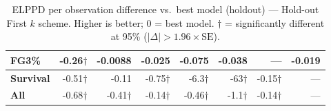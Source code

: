 \begin{table}[H]
{\begin{tabular}{lrrrrrrr}
FG3\% & -0.26$\dagger$ & -0.0088 & -0.025 & -0.075 & -0.038 & --- & -0.019 \\[2pt]
\midrule
\textbf{Survival} & -0.51$\dagger$ & -0.11 & -0.75$\dagger$ & -6.3$\dagger$ & -63$\dagger$ & -0.15$\dagger$ & --- \\
\midrule
\textbf{All} & -0.68$\dagger$ & -0.41$\dagger$ & -0.14$\dagger$ & -0.46$\dagger$ & -1.1$\dagger$ & -0.14$\dagger$ & --- \\
\bottomrule
\end{tabular}
}
\caption{ELPPD per observation difference vs.\ best model (holdout) --- Hold-out First $k$ scheme. Higher is better; 0 = best model. $\dagger$ = significantly different at 95\% ($|\Delta|>1.96\times\mathrm{SE}$).}
\label{tab:elppd_holdout_first_k}
\end{table}


